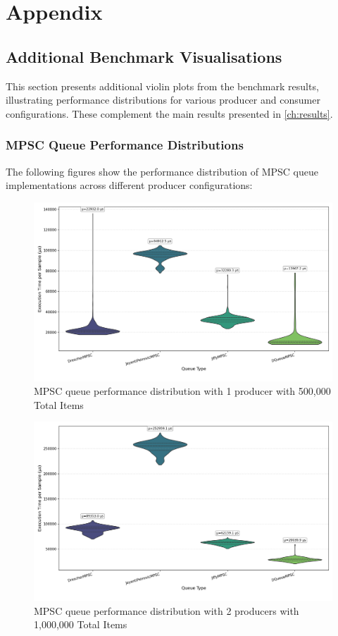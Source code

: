 \chapter{Appendix}

\section{Additional Benchmark Visualisations}
This section presents additional violin plots from the benchmark results, illustrating performance distributions for various producer and consumer configurations. These complement the main results presented in \cref{ch:results}.

\subsection{MPSC Queue Performance Distributions}\label{subsec:mpsc-violin}
The following figures show the performance distribution of MPSC queue implementations across different producer configurations:

\begin{figure}[H]
\centering
\caption{MPSC queue performance distribution with 1 producer with 500,000 Total Items}
\label{fig:mpsc-violin-1p}
\includegraphics[width=\textwidth]{images/results/mpsc_performance_violin_1_producers.png}
\end{figure}

\begin{figure}[H]
\centering
\caption{MPSC queue performance distribution with 2 producers with 1,000,000 Total Items}
\label{fig:mpsc-violin-2p}
\includegraphics[width=\textwidth]{images/results/mpsc_performance_violin_2_producers.png}
\end{figure}

